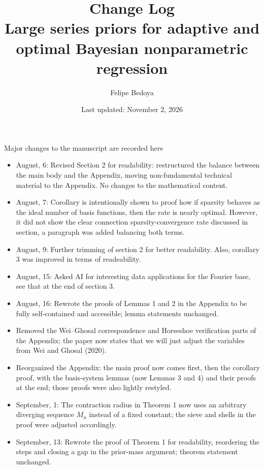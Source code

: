 \documentclass[11pt]{article}
\title{Change Log\\[4pt]\large Large series priors for adaptive and optimal Bayesian nonparametric regression}
\author{Felipe Bedoya}
\date{Last updated: November 2, 2026}
\begin{document}
\maketitle

Major changes to the manuscript are recorded here

\begin{itemize}
    \item August, 6: Revised Section 2 for readability: restructured the balance between the main body and the Appendix, moving non-fundamental technical material to the Appendix. No changes to the mathematical content.

    \item August, 7: Corollary is intentionally shown to proof how if sparsity behaves as the ideal number of basis functions, then the rate is nearly optimal. However, it did not show the clear connection sparsity-convergence rate discussed in section, a paragraph was added balancing both terms.
    

    \item August, 9: Further trimming of section 2 for better readability. Also, corollary 3 was improved in terms of readeability.

    \item August, 15:  Asked AI for interesting data applications for the Fourier base, see that at the end of section 3.

    \item August, 16: Rewrote the proofs of Lemmas 1 and 2 in the Appendix to be fully self-contained and accessible; lemma statements unchanged.

    \item Removed the Wei--Ghosal correspondence and Horseshoe verification parts of the Appendix; the paper now states that we will just adjust the variables from Wei and Ghosal (2020).

    \item Reorganized the Appendix: the main proof now comes first, then the corollary proof, with the basis-system lemmas (now Lemmas 3 and 4) and their proofs at the end; those proofs were also lightly restyled.

    \item September, 1: The contraction radius in Theorem 1 now uses an arbitrary diverging sequence $M_n$ instead of a fixed constant; the sieve and shells in the proof were adjusted accordingly.

    \item September, 13: Rewrote the proof of Theorem 1 for readability, reordering the steps and closing a gap in the prior-mass argument; theorem statement unchanged.


\end{itemize}
\end{document}
